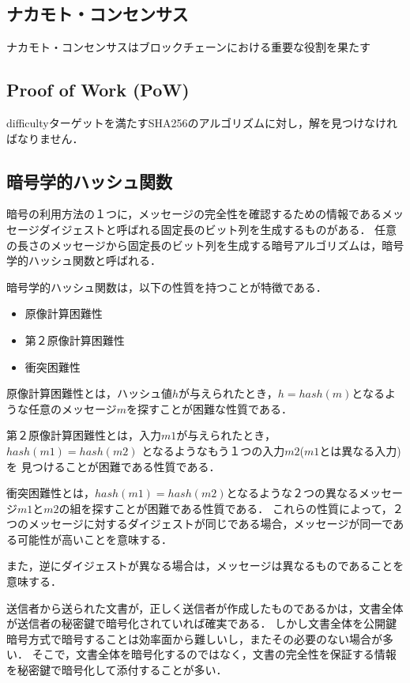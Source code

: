 \documentclass[a4paper,12pt]{jsarticle}
\begin{document}
      \subsection{ナカモト・コンセンサス}
      ナカモト・コンセンサスはブロックチェーンにおける重要な役割を果たす


      \subsection{Proof of Work (PoW)}
difficultyターゲットを満たすSHA256のアルゴリズムに対し，解を見つけなければなりません．

      \subsection{暗号学的ハッシュ関数} %

暗号の利用方法の１つに，メッセージの完全性を確認するための情報であるメッセージダイジェストと呼ばれる固定長のビット列を生成するものがある．
任意の長さのメッセージから固定長のビット列を生成する暗号アルゴリズムは，暗号学的ハッシュ関数と呼ばれる．

暗号学的ハッシュ関数は，以下の性質を持つことが特徴である．
\begin{itemize}
  \item 原像計算困難性
  \item 第２原像計算困難性
  \item 衝突困難性
\end{itemize}

原像計算困難性とは，ハッシュ値$h$が与えられたとき，$ h = hash(m)$となるような任意のメッセージ$m$を探すことが困難な性質である．

第２原像計算困難性とは，入力$m1$が与えられたとき，$ hash(m1) = hash(m2)$ となるようなもう１つの入力$m2$($m1$とは異なる入力)を
見つけることが困難である性質である．

衝突困難性とは，$hash(m1)= hash(m2)$となるような２つの異なるメッセージ$m1$と$m2$の組を探すことが困難である性質である．
これらの性質によって，２つのメッセージに対するダイジェストが同じである場合，メッセージが同一である可能性が高いことを意味する．

また，逆にダイジェストが異なる場合は，メッセージは異なるものであることを意味する．


送信者から送られた文書が，正しく送信者が作成したものであるかは，文書全体が送信者の秘密鍵で暗号化されていれば確実である．
しかし文書全体を公開鍵暗号方式で暗号することは効率面から難しいし，またその必要のない場合が多い．
そこで，文書全体を暗号化するのではなく，文書の完全性を保証する情報を秘密鍵で暗号化して添付することが多い．
\end{document}
